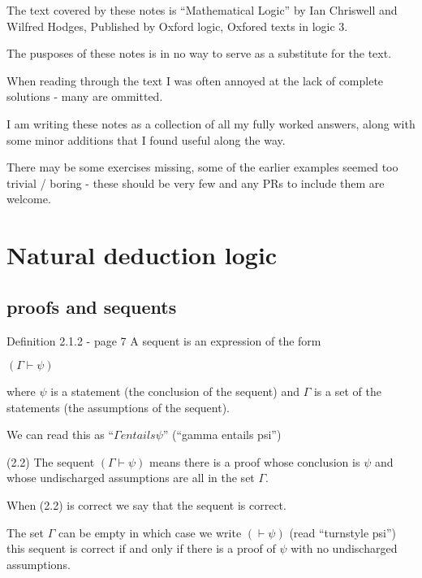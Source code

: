 \documentclass[a4paper, titlepage]{report}
\begin{document}
The text covered by these notes is ``Mathematical Logic'' by Ian Chriswell and Wilfred Hodges,
Published by Oxford logic, Oxfored texts in logic 3.

The pusposes of these notes is in no way to serve as a substitute for the text.

When reading through the text I was often annoyed at the lack of complete solutions - many are ommitted.


I am writing these notes as a collection of all my fully worked answers, along with some minor additions that I found useful
along the way.

There may be some exercises missing, some of the earlier examples seemed too trivial / boring - these should be very few
and any PRs to include them are welcome.


\chapter{Natural deduction logic}

\section{proofs and sequents}

Definition 2.1.2 - page 7
  A sequent is an expression of the form

  $(\Gamma \vdash \psi)$

  where $\psi$ is a statement (the conclusion of the sequent) and $\Gamma$ is a set of the statements (the assumptions of the sequent).

  We can read this as  ``$\Gamma entails \psi$'' (``gamma entails psi'')

(2.2) The sequent $(\Gamma \vdash \psi)$ means
  there is a proof whose conclusion is $\psi$ and whose undischarged assumptions are all in the set $\Gamma$.

When (2.2) is correct we say that the sequent is correct.

The set $\Gamma$ can be empty in which case we write $(\vdash \psi)$ (read ``turnstyle psi'')
this sequent is correct if and only if there is a proof of $\psi$ with no undischarged assumptions.

\bigskip

  
  
\end{document}
